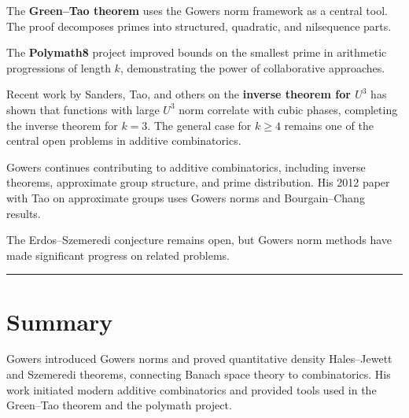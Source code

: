 The \textbf{Green--Tao theorem} uses the Gowers norm framework as a
central tool.  The proof decomposes primes into structured,
quadratic, and nilsequence parts.

The \textbf{Polymath8} project improved bounds on the smallest
prime in arithmetic progressions of length $k$, demonstrating the
power of collaborative approaches.

Recent work by Sanders, Tao, and others on the \textbf{inverse
theorem for $U^3$} has shown that functions with large $U^3$ norm
correlate with cubic phases, completing the inverse theorem for
$k=3$.  The general case for $k\geq 4$ remains one of the central
open problems in additive combinatorics.

Gowers continues contributing to additive combinatorics, including
inverse theorems, approximate group structure, and prime
distribution.  His 2012 paper with Tao on approximate groups uses
Gowers norms and Bourgain--Chang results.

The Erdos--Szemeredi conjecture remains open, but Gowers norm
methods have made significant progress on related problems.

\begin{center}\rule{0.5\linewidth}{0.5pt}\end{center}

\section*{Summary}

Gowers introduced Gowers norms and proved quantitative density
Hales--Jewett and Szemeredi theorems, connecting Banach space
theory to combinatorics.  His work initiated modern additive
combinatorics and provided tools used in the Green--Tao theorem and
the polymath project.

